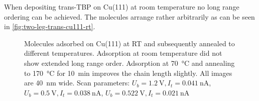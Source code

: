 When depositing trans-TBP on Cu(111) at room temperature no long range ordering can be achieved. The molecules arrange rather arbitrarily as can be seen in  \autoref{fig:two-leg-trans-cu111-rt}.

\begin{figure}[h]
 \centering
\caption{Molecules adsorbed on Cu(111) at RT and subsequently annealed to different temperatures.  Adsorption at room temperature did not show extended long range order.   Adsorption at \SI{70}{\celsius} and  annealing to \SI{170}{\celsius} for \SI{10}{\minute} improves the chain length slightly. All images are \SI{40}{\nano \meter} wide. Scan parameters:  $U_b=\SI{1.2}{\volt}, I_t=\SI{0.041}{\nano \ampere}$,  $U_b=\SI{0.5}{\volt}, I_t=\SI{0.038}{\nano \ampere}$,  $U_b=\SI{0.522}{\volt}, I_t=\SI{0.021}{\nano \ampere}$}
\label{fig:two-leg-trans-cu111}
\end{figure}

